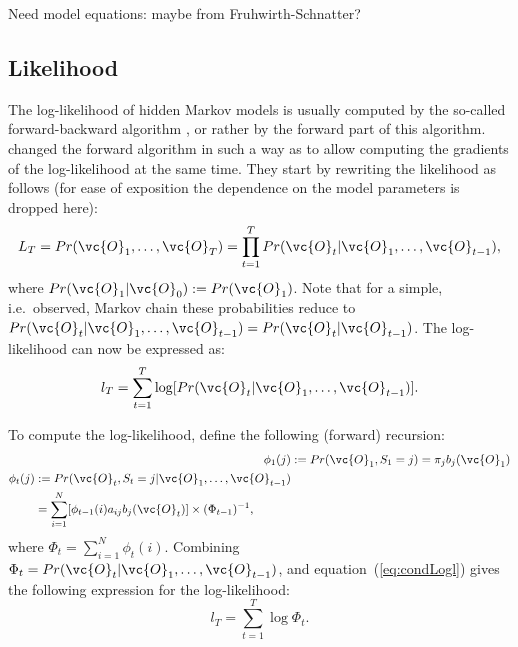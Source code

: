 \documentclass[article]{jss}
\begin{document}
Need model equations: maybe from Fruhwirth-Schnatter?


\subsection{Likelihood}

The log-likelihood of hidden Markov models is usually computed by the
so-called forward-backward algorithm \citep{Baum1966,Rabiner1989}, or
rather by the forward part of this algorithm.  \cite{Lystig2002}
changed the forward algorithm in such a way as to allow computing the
gradients of the log-likelihood at the same time.  They start by
rewriting the likelihood as follows (for ease of exposition the
dependence on the model parameters is dropped here):
\begin{equation}
	L_{T} = Pr(\vc{O}_{1}, \ldots, \vc{O}_{T}) = \prod_{t=1}^{T} 
Pr(\vc{O}_{t}|\vc{O}_{1}, 
	\ldots, \vc{O}_{t-1}), 
	\label{condLike}
\end{equation}
where $Pr(\vc{O}_{1}|\vc{O}_{0}):=Pr(\vc{O}_{1})$. Note that for a 
simple, i.e.\ observed, Markov chain these probabilities reduce to 
$Pr(\vc{O}_{t}|\vc{O}_{1},\ldots, 
\vc{O}_{t-1})=Pr(\vc{O}_{t}|\vc{O}_{t-1})$.
The log-likelihood can now be expressed as:
\begin{equation}
	l_{T} = \sum_{t=1}^{T} \log[Pr(\vc{O}_{t}|\vc{O}_{1}, \ldots, 
\vc{O}_{t-1})].
	\label{eq:condLogl}
\end{equation}

To compute the log-likelihood, \cite{Lystig2002} define the following 
(forward) recursion:
\begin{align}
	\phi_{1}(j) &:= Pr(\vc{O}_{1}, S_{1}=j) = \pi_{j} b_{j}(\vc{O}_{1}) 
	\label{eq:fwd1} \\
\begin{split}
	\phi_{t}(j) &:= Pr(\vc{O}_{t}, S_{t}=j|\vc{O}_{1}, \ldots, 
\vc{O}_{t-1}) \\
	&= \sum_{i=1}^{N} [\phi_{t-1}(i)a_{ij}b_{j}(\vc{O}_{t})] \times 
(\Phi_{t-1})^{-1},
	\label{eq:fwdt} 
\end{split} 
\end{align}
where $\Phi_{t}=\sum_{i=1}^{N} \phi_{t}(i)$. Combining 
$\Phi_{t}=Pr(\vc{O}_{t}|\vc{O}_{1}, \ldots, \vc{O}_{t-1})$, and 
equation~(\ref{eq:condLogl}) gives the following expression for the 
log-likelihood:
\begin{equation}
	l_{T} = \sum_{t=1}^{T} \log \Phi_{t}.
	\label{eq:logl}
\end{equation}
\end{document}
